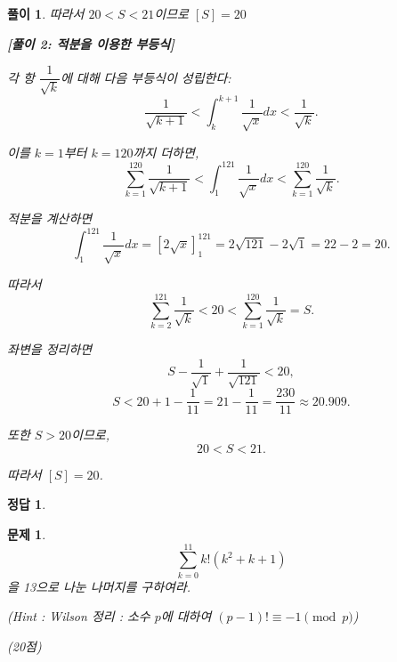 \documentclass[12pt,a4paper]{article}
\theoremstyle{test_form}
\newtheorem{problem}{문제}[section]
\newtheorem*{solution}{풀이}
\newtheorem*{answer}{정답}
\begin{document}
\begin{solution}
따라서 \(20<S<21\)이므로 \([S]=20\)

\vspace{0.5cm}

\textbf{[풀이 2: 적분을 이용한 부등식]}

각 항 \(\dfrac{1}{\sqrt{k}}\)에 대해 다음 부등식이 성립한다:
\[
\frac{1}{\sqrt{k+1}}<\int_k^{k+1}\frac{1}{\sqrt{x}}dx<\frac{1}{\sqrt{k}}.
\]

이를 \(k=1\)부터 \(k=120\)까지 더하면,
\[
\sum_{k=1}^{120}\frac{1}{\sqrt{k+1}}<\int_1^{121}\frac{1}{\sqrt{x}}dx<\sum_{k=1}^{120}\frac{1}{\sqrt{k}}.
\]

적분을 계산하면
\[
\int_1^{121}\frac{1}{\sqrt{x}}dx=\left[2\sqrt{x}\right]_1^{121}=2\sqrt{121}-2\sqrt{1}=22-2=20.
\]

따라서
\[
\sum_{k=2}^{121}\frac{1}{\sqrt{k}}<20<\sum_{k=1}^{120}\frac{1}{\sqrt{k}}=S.
\]

좌변을 정리하면
\[
S-\frac{1}{\sqrt{1}}+\frac{1}{\sqrt{121}}<20,
\]
\[
S<20+1-\frac{1}{11}=21-\frac{1}{11}=\frac{230}{11}\approx 20.909.
\]

또한 \(S>20\)이므로,
\[
20<S<21.
\]

따라서 \([S]=20\).

\end{solution}

\begin{answer}
\hfill {}
\end{answer}

\newpage

\begin{problem}

\[
\sum_{k=0}^{11}k!(k^2+k+1)
\]
을 13으로 나눈 나머지를 구하여라.

\begin{flushright}(Hint : Wilson 정리 : 소수 \(p\)에 대하여 \((p-1)!\equiv -1\pmod{p}\))\end{flushright}

\begin{flushright}(20점)\end{flushright}

\end{problem}
\end{document}
